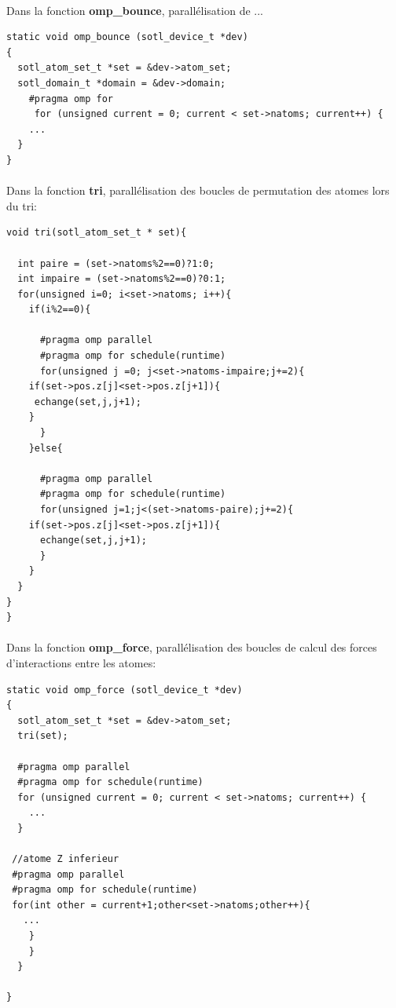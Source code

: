 \documentclass[a4paper,11pt]{report}
\begin{document}
\paragraph{}
Dans la fonction \textbf{omp\_bounce}, parallélisation de ...

\begin{lstlisting}[style=CStyle]
static void omp_bounce (sotl_device_t *dev)
{
  sotl_atom_set_t *set = &dev->atom_set;
  sotl_domain_t *domain = &dev->domain;
    #pragma omp for
     for (unsigned current = 0; current < set->natoms; current++) {
	...
  }
}
\end{lstlisting}

\paragraph{}
Dans la fonction \textbf{tri}, parallélisation des boucles de permutation des atomes lors du tri:
\newline
\begin{lstlisting}[style=CStyle]
void tri(sotl_atom_set_t * set){

  int paire = (set->natoms%2==0)?1:0;
  int impaire = (set->natoms%2==0)?0:1;
  for(unsigned i=0; i<set->natoms; i++){
    if(i%2==0){

      #pragma omp parallel
      #pragma omp for schedule(runtime)
      for(unsigned j =0; j<set->natoms-impaire;j+=2){
	if(set->pos.z[j]<set->pos.z[j+1]){
	 echange(set,j,j+1);
	}
      }
    }else{

      #pragma omp parallel
      #pragma omp for schedule(runtime)
      for(unsigned j=1;j<(set->natoms-paire);j+=2){
	if(set->pos.z[j]<set->pos.z[j+1]){
	  echange(set,j,j+1);
      }
    }
  }
}
}

\end{lstlisting}

\paragraph{}
Dans la fonction \textbf{omp\_force}, parallélisation des boucles de calcul des forces d'interactions entre les atomes:
\newline

\begin{lstlisting}[style=CStyle]
static void omp_force (sotl_device_t *dev)
{
  sotl_atom_set_t *set = &dev->atom_set;
  tri(set);
  
  #pragma omp parallel
  #pragma omp for schedule(runtime)
  for (unsigned current = 0; current < set->natoms; current++) {
    ...
  }

 //atome Z inferieur
 #pragma omp parallel
 #pragma omp for schedule(runtime)
 for(int other = current+1;other<set->natoms;other++){
   ...
	}
    }
  }

}
\end{lstlisting}
\end{document}
